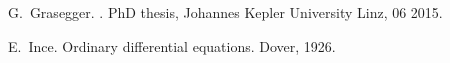 \documentclass[10pt,a4paper]{article}
\begin{document}
\begin{thebibliography}{10}
G.~Grasegger.
.
\newblock PhD thesis, Johannes Kepler University Linz, 06 2015.



E.~Ince.
\newblock Ordinary differential equations.
\newblock Dover, 1926.
% 






\end{thebibliography}
\end{document}
